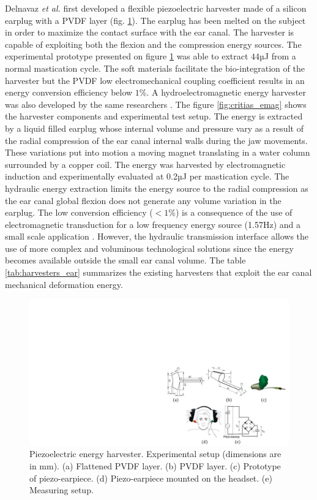 \documentclass[3p,twocolumn,preprint]{elsarticle}
\begin{document}
Delnavaz \emph{et al.} first developed a flexible piezoelectric harvester made of a silicon earplug with a PVDF layer \cite{Delnavaz2013} (fig. \ref{fig:critias_piezo}). The earplug has been melted on the subject in order to maximize the contact surface with the ear canal. The harvester is capable of exploiting both the flexion and the compression energy sources. The experimental prototype presented on figure \ref{fig:critias_piezo} was able to extract $44$µJ from a normal mastication cycle. The soft materials facilitate the bio-integration of the harvester but the PVDF low electromechanical coupling coefficient results in an energy conversion efficiency below $1\%$. A hydroelectromagnetic energy harvester was also developed by the same researchers \cite{Delnavaz2012}. The figure \ref{fig:critias_emag} shows the harvester components and experimental test setup. The energy is extracted by a liquid filled earplug whose internal volume and pressure vary as a result of the radial compression of the ear canal internal walls during the jaw movements. These variations put into motion a moving magnet translating in a water column surrounded by a copper coil. The energy was harvested by electromagnetic induction and experimentally evaluated at 0.2µJ per mastication cycle. The hydraulic energy extraction limits the energy source to the radial compression as the ear canal global flexion does not generate any volume variation in the earplug. The low conversion efficiency ($<1\%$) is a consequence of the use of electromagnetic transduction for a low frequency energy source (1.57Hz) and a small scale application \cite{Kulah2008,Priya2017}. However, the hydraulic transmission interface allows the use of more complex and voluminous technological solutions since the energy becomes available outside the small ear canal volume. The table \ref{tab:harvesters_ear} summarizes the existing harvesters that exploit the ear canal mechanical deformation energy. \\
\begin{figure}[!htbp]
	\centering
	\captionsetup{justification=centering}
	\includegraphics[trim={18cm 0cm 0cm 8.7cm},clip, width=\linewidth]{figures/critias_piezo.pdf}
	\caption{Piezoelectric energy harvester. Experimental setup (dimensions are in mm). (a) Flattened PVDF layer. (b) PVDF layer. (c) Prototype of piezo-earpiece. (d) Piezo-earpiece mounted on the headset. (e) Measuring setup. \cite{Delnavaz2013}}  
	\label{fig:critias_piezo}
\end{figure}
\end{document}
